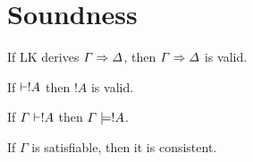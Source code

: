 \documentclass[open-logic-section]{subfiles}
\begin{document}
\section{Soundness}


\begin{thm}
If LK derives $\Gamma \Rightarrow \Delta$, then $\Gamma \Rightarrow \Delta$ is valid.
\end{thm}

\begin{thm}
If $\Proves !A$ then $!A$ is valid.
\end{thm}

\begin{thm}
If $\Gamma \Proves !A$ then $\Gamma \Entails !A$.
\end{thm}

\begin{thm}
If $\Gamma$ is satisfiable, then it is consistent.
\end{thm}
\end{document}
